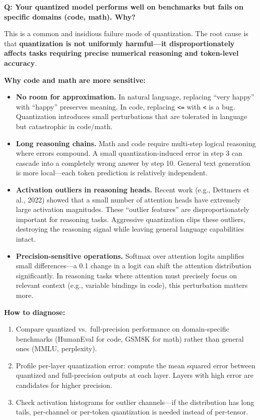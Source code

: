 \begin{interviewq}
\textbf{Q: Your quantized model performs well on benchmarks but fails on specific domains (code, math). Why?}

 \quad {} \quad \badgefreq{\freqmed}

\stronganswer

This is a common and insidious failure mode of quantization. The root cause is that \textbf{quantization is not uniformly harmful---it disproportionately affects tasks requiring precise numerical reasoning and token-level accuracy}.

\textbf{Why code and math are more sensitive:}
\begin{itemize}
    \item \textbf{No room for approximation.} In natural language, replacing ``very happy'' with ``happy'' preserves meaning. In code, replacing \texttt{<=} with \texttt{<} is a bug. Quantization introduces small perturbations that are tolerated in language but catastrophic in code/math.
    \item \textbf{Long reasoning chains.} Math and code require multi-step logical reasoning where errors compound. A small quantization-induced error in step 3 can cascade into a completely wrong answer by step 10. General text generation is more local---each token prediction is relatively independent.
    \item \textbf{Activation outliers in reasoning heads.} Recent work (e.g., Dettmers et al., 2022) showed that a small number of attention heads have extremely large activation magnitudes. These ``outlier features'' are disproportionately important for reasoning tasks. Aggressive quantization clips these outliers, destroying the reasoning signal while leaving general language capabilities intact.
    \item \textbf{Precision-sensitive operations.} Softmax over attention logits amplifies small differences---a 0.1 change in a logit can shift the attention distribution significantly. In reasoning tasks where attention must precisely focus on relevant context (e.g., variable bindings in code), this perturbation matters more.
\end{itemize}

\textbf{How to diagnose:}
\begin{enumerate}
    \item Compare quantized vs.\ full-precision performance on domain-specific benchmarks (HumanEval for code, GSM8K for math) rather than general ones (MMLU, perplexity).
    \item Profile per-layer quantization error: compute the mean squared error between quantized and full-precision outputs at each layer. Layers with high error are candidates for higher precision.
    \item Check activation histograms for outlier channels---if the distribution has long tails, per-channel or per-token quantization is needed instead of per-tensor.
\end{enumerate}


\end{interviewq}
